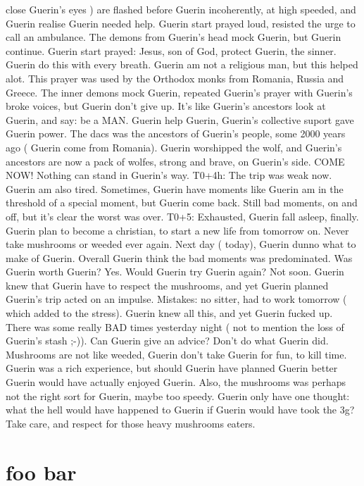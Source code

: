 \documentclass[12pt]{book}
\begin{document}
close Guerin's eyes ) are flashed before Guerin incoherently, at high speeded, and Guerin realise Guerin needed help. Guerin start prayed loud, resisted the urge to call an ambulance. The demons from Guerin's head mock Guerin, but Guerin continue. Guerin start prayed: Jesus, son of God, protect Guerin, the sinner. Guerin do this with every breath. Guerin am not a religious man, but this helped alot. This prayer was used by the Orthodox monks from Romania, Russia and Greece. The inner demons mock Guerin, repeated Guerin's prayer with Guerin's broke voices, but Guerin don't give up. It's like Guerin's ancestors look at Guerin, and say: be a MAN. Guerin help Guerin, Guerin's collective suport gave Guerin power. The dacs was the ancestors of Guerin's people, some 2000 years ago ( Guerin come from Romania). Guerin worshipped the wolf, and Guerin's ancestors are now a pack of wolfes, strong and brave, on Guerin's side. COME NOW! Nothing can stand in Guerin's way. T0+4h: The trip was weak now. Guerin am also tired. Sometimes, Guerin have moments like Guerin am in the threshold of a special moment, but Guerin come back. Still bad moments, on and off, but it's clear the worst was over. T0+5: Exhausted, Guerin fall asleep, finally. Guerin plan to become a christian, to start a new life from tomorrow on. Never take mushrooms or weeded ever again. Next day ( today), Guerin dunno what to make of Guerin. Overall Guerin think the bad moments was predominated. Was Guerin worth Guerin? Yes. Would Guerin try Guerin again? Not soon. Guerin knew that Guerin have to respect the mushrooms, and yet Guerin planned Guerin's trip acted on an impulse. Mistakes: no sitter, had to work tomorrow ( which added to the stress). Guerin knew all this, and yet Guerin fucked up. There was some really BAD times yesterday night ( not to mention the loss of Guerin's stash ;-)). Can Guerin give an advice? Don't do what Guerin did. Mushrooms are not like weeded, Guerin don't take Guerin for fun, to kill time. Guerin was a rich experience, but should Guerin have planned Guerin better Guerin would have actually enjoyed Guerin. Also, the mushrooms was perhaps not the right sort for Guerin, maybe too speedy. Guerin only have one thought: what the hell would have happened to Guerin if Guerin would have took the 3g? Take care, and respect for those heavy mushrooms eaters.



\chapter{foo bar}
\end{document}
